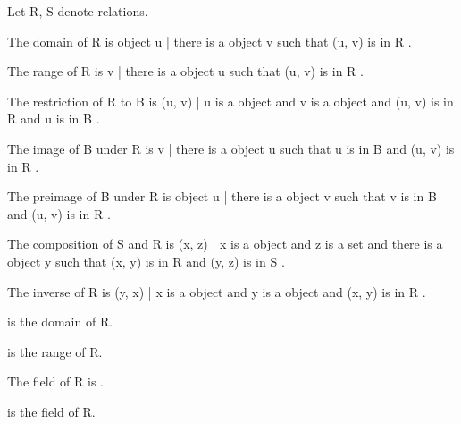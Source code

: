 \documentclass{article}
\begin{document}
\begin{forthel}
    Let R, S denote relations.

    \begin{definition} 
      The domain of R is { object u | there is a object v such that (u, v) is in R }.
    \end{definition}

    \begin{definition} 
      The range of R is { v | there is a object u such that (u, v) is in R }.
    \end{definition}

    \begin{definition} 
      The restriction of R to B is { (u, v) | u is a object and v is a object and (u, v) is in R and u is in B }.
    \end{definition}

    \begin{definition} 
      The image of B under R is { v | there is a object u such that u is in B and (u, v) is in R }.
    \end{definition}

    \begin{definition} 
      The preimage of B under R is { object u | there is a object v such that v is in B and (u, v) is in R }.
    \end{definition}

    \begin{definition} 
      The composition of S and R is { (x, z) | x is a object and z is a set and there is a object y such that (x, y) is in R and (y, z) is in S }.
    \end{definition}

    \begin{definition} 
      The inverse of R is { (y, x) | x is a object and y is a object and (x, y) is in R }.
    \end{definition}

    \begin{definition} 
       is the domain of R.
    \end{definition}

    \begin{definition} 
       is the range of R.
    \end{definition}

    \begin{definition}
      The field of R is .
    \end{definition}

    \begin{definition} 
       is the field of R.
    \end{definition}


\end{forthel}
\end{document}

